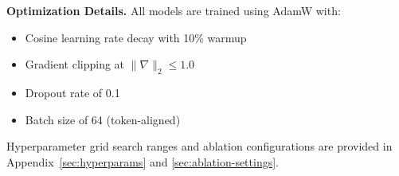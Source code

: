 \vspace{0.5em}
\noindent\textbf{Optimization Details.} All models are trained using AdamW \cite{loshchilov2019decoupled} with:
\begin{itemize}[leftmargin=1.5em]
  \item Cosine learning rate decay with 10\% warmup
  \item Gradient clipping at \(\|\nabla\|_2 \leq 1.0\)
  \item Dropout rate of 0.1
  \item Batch size of 64 (token-aligned)
\end{itemize}
Hyperparameter grid search ranges and ablation configurations are provided in Appendix~\ref{sec:hyperparams} and \ref{sec:ablation-settings}.